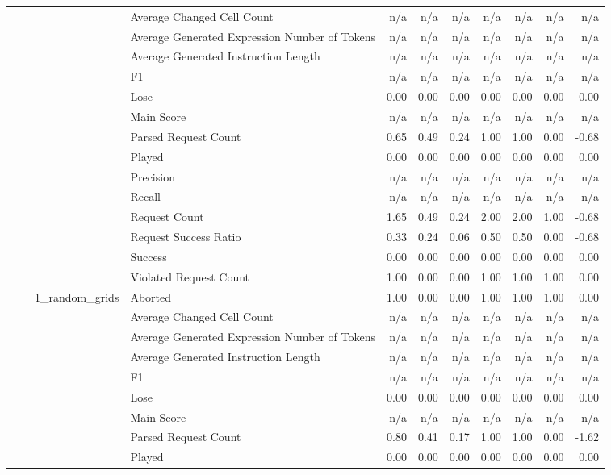 \begin{tabular}{llllrrrrrrr}
 &  &  & Average Changed Cell Count & n/a & n/a & n/a & n/a & n/a & n/a & n/a \\
 &  &  & Average Generated Expression Number of Tokens & n/a & n/a & n/a & n/a & n/a & n/a & n/a \\
 &  &  & Average Generated Instruction Length & n/a & n/a & n/a & n/a & n/a & n/a & n/a \\
 &  &  & F1 & n/a & n/a & n/a & n/a & n/a & n/a & n/a \\
 &  &  & Lose & 0.00 & 0.00 & 0.00 & 0.00 & 0.00 & 0.00 & 0.00 \\
 &  &  & Main Score & n/a & n/a & n/a & n/a & n/a & n/a & n/a \\
 &  &  & Parsed Request Count & 0.65 & 0.49 & 0.24 & 1.00 & 1.00 & 0.00 & -0.68 \\
 &  &  & Played & 0.00 & 0.00 & 0.00 & 0.00 & 0.00 & 0.00 & 0.00 \\
 &  &  & Precision & n/a & n/a & n/a & n/a & n/a & n/a & n/a \\
 &  &  & Recall & n/a & n/a & n/a & n/a & n/a & n/a & n/a \\
 &  &  & Request Count & 1.65 & 0.49 & 0.24 & 2.00 & 2.00 & 1.00 & -0.68 \\
 &  &  & Request Success Ratio & 0.33 & 0.24 & 0.06 & 0.50 & 0.50 & 0.00 & -0.68 \\
 &  &  & Success & 0.00 & 0.00 & 0.00 & 0.00 & 0.00 & 0.00 & 0.00 \\
 &  &  & Violated Request Count & 1.00 & 0.00 & 0.00 & 1.00 & 1.00 & 1.00 & 0.00 \\
\cline{3-11}
 &  & \multirow[t]{15}{*}{1_random_grids} & Aborted & 1.00 & 0.00 & 0.00 & 1.00 & 1.00 & 1.00 & 0.00 \\
 &  &  & Average Changed Cell Count & n/a & n/a & n/a & n/a & n/a & n/a & n/a \\
 &  &  & Average Generated Expression Number of Tokens & n/a & n/a & n/a & n/a & n/a & n/a & n/a \\
 &  &  & Average Generated Instruction Length & n/a & n/a & n/a & n/a & n/a & n/a & n/a \\
 &  &  & F1 & n/a & n/a & n/a & n/a & n/a & n/a & n/a \\
 &  &  & Lose & 0.00 & 0.00 & 0.00 & 0.00 & 0.00 & 0.00 & 0.00 \\
 &  &  & Main Score & n/a & n/a & n/a & n/a & n/a & n/a & n/a \\
 &  &  & Parsed Request Count & 0.80 & 0.41 & 0.17 & 1.00 & 1.00 & 0.00 & -1.62 \\
 &  &  & Played & 0.00 & 0.00 & 0.00 & 0.00 & 0.00 & 0.00 & 0.00 \\

\end{tabular}
